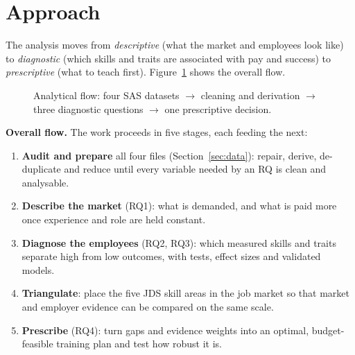 \section{Approach}\label{sec:approach}

The analysis moves from \emph{descriptive} (what the market and employees look like) to
\emph{diagnostic} (which skills and traits are associated with pay and success) to
\emph{prescriptive} (what to teach first). Figure~\ref{fig:flow} shows the overall flow.

\begin{figure}[H]\centering
\resizebox{\linewidth}{!}{}
\caption{Analytical flow: four SAS datasets $\rightarrow$ cleaning and derivation $\rightarrow$
three diagnostic questions $\rightarrow$ one prescriptive decision.}\label{fig:flow}
\end{figure}

\textbf{Overall flow.} The work proceeds in five stages, each feeding the next:
\begin{enumerate}
  \item \textbf{Audit and prepare} all four files (Section~\ref{sec:data}): repair, derive, de-duplicate
        and reduce until every variable needed by an RQ is clean and analysable.
  \item \textbf{Describe the market} (RQ1): what is demanded, and what is paid more once
        experience and role are held constant.
  \item \textbf{Diagnose the employees} (RQ2, RQ3): which measured skills and traits separate
        high from low outcomes, with tests, effect sizes and validated models.
  \item \textbf{Triangulate}: place the five JDS skill areas in the job market so that market and
        employer evidence can be compared on the same scale.
  \item \textbf{Prescribe} (RQ4): turn gaps and evidence weights into an optimal, budget-feasible
        training plan and test how robust it is.
\end{enumerate}

